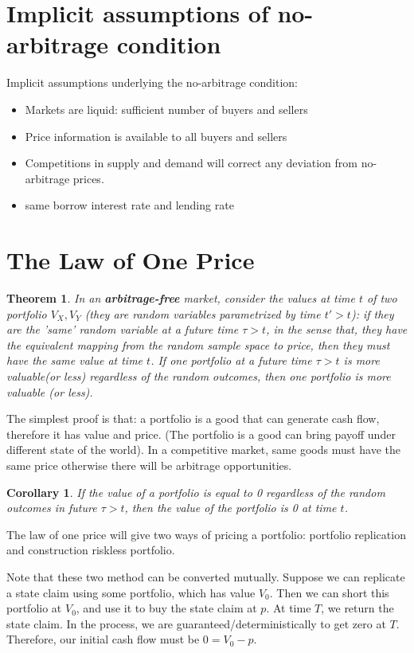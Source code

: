 \documentclass[a4paper,13pt]{report}
\newtheorem{theorem}{Theorem}[section]
\newtheorem{corollary}{Corollary}[theorem]
\begin{document}
\section{Implicit assumptions of no-arbitrage condition}
Implicit assumptions underlying the no-arbitrage condition:
\begin{itemize}
    \item Markets are liquid: sufficient number of buyers and sellers
    \item Price information is available to all buyers and sellers
    \item Competitions in supply and demand will correct any deviation from no-arbitrage prices. 
    \item same borrow interest rate and lending rate
\end{itemize}

\section{The Law of One Price}
\begin{theorem}
In an \textbf{arbitrage-free} market, consider the values at time $t$ of two portfolio $V_X,V_Y$ (they are random variables parametrized by time $t'>t$): if they are the 'same' random variable at a future time $\tau > t$, in the sense that, they have the equivalent mapping from the random sample space to price, then they must have the same value at time $t$. If one portfolio at a future time $\tau > t$ is more valuable(or less) regardless of the random outcomes, then one portfolio is more valuable (or less).\cite{stefanica2008primer} 
\end{theorem}
The simplest proof is that: a portfolio is a good that can generate cash flow, therefore it has value and price. (The portfolio is a good can bring payoff under different state of the world). In a competitive market, same goods must have the same price otherwise there will be arbitrage opportunities.  

\begin{corollary}
If the value of a portfolio is equal to 0 regardless of the random outcomes in future $\tau > t$, then the value of the portfolio is 0 at time $t$.
\end{corollary}

The law of one price will give two ways of pricing a portfolio: portfolio replication and construction riskless portfolio. 

Note that these two method can be converted mutually. Suppose we can replicate a state claim using some portfolio, which has value $V_0$. Then we can short this portfolio at $V_0$, and use it to buy the state claim at $p$. At time $T$, we return the state claim. In the process, we are guaranteed/deterministically to get zero at $T$. Therefore, our initial cash flow must be $0=V_0 - p$.
\end{document}
